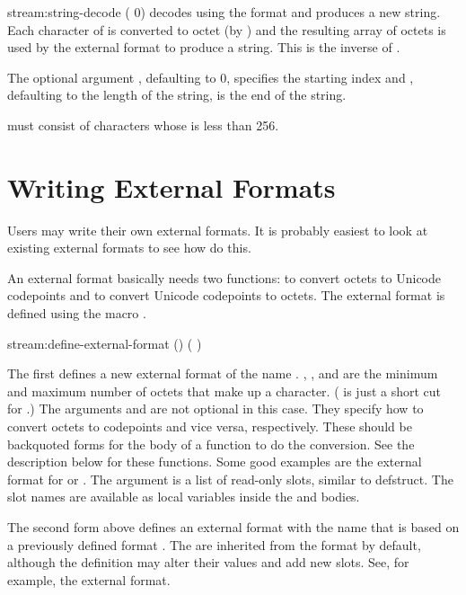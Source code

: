 \begin{defun}{stream:}{string-decode}{\args {}
     \ampoptional{} ( 0) }
   decodes  using the format
   and produces a new string.  Each character of
   is converted to octet (by ) and the
  resulting array of octets is used by the external format to produce
  a string.  This is the inverse of .

  The optional argument , defaulting to 0, specifies the
  starting index and , defaulting to the length of the
  string, is the end of the string.

   must consist of characters whose  is
  less than 256.
\end{defun}

\section{Writing External Formats}

Users may write their own external formats.  It is probably easiest to
look at existing external formats to see how do this.

An external format basically needs two functions:
 to convert octets to Unicode codepoints and
 to convert Unicode codepoints to octets.  The
external format is defined using the macro
.

\begin{defmac}[base]{stream:}{define-external-format}{\args {}
    () (\amprest{} )
    }

  The first defines a new external format of the name .
  , , and  are the minimum and maximum
  number of octets that make up a character.  ( is
  just a short cut for .)  The arguments
   and  are not optional in
  this case.  They specify how to convert octets to codepoints and
  vice versa, respectively.  These should be backquoted forms for the
  body of a function to do the conversion.  See the description below
  for these functions.  Some good examples are the external format for
   or .  The  argument is a list of
  read-only slots, similar to defstruct.  The slot names are available as
  local variables inside the  and 
  bodies.

  The second form above defines an external format with the name
   that is based on a previously defined format .
  The  are inherited from the  format by default,
  although the definition may alter their values and add new slots.
  See, for example, the  external format.

\end{defmac}


